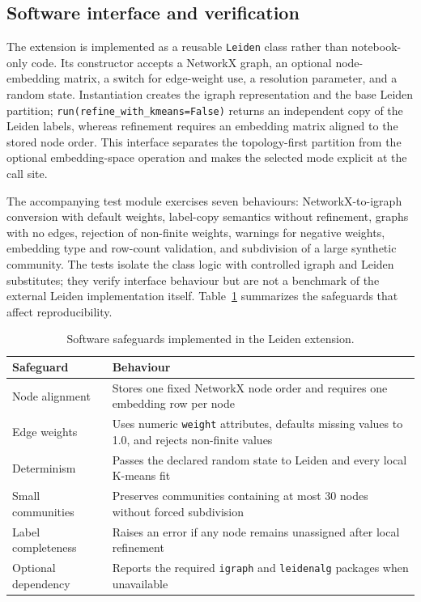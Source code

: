 \documentclass[11pt]{article}
\begin{document}
\subsection{Software interface and verification}

The extension is implemented as a reusable \texttt{Leiden} class rather than notebook-only code. Its constructor accepts a NetworkX graph, an optional node-embedding matrix, a switch for edge-weight use, a resolution parameter, and a random state. Instantiation creates the igraph representation and the base Leiden partition; \texttt{run(refine\_with\_kmeans=False)} returns an independent copy of the Leiden labels, whereas refinement requires an embedding matrix aligned to the stored node order. This interface separates the topology-first partition from the optional embedding-space operation and makes the selected mode explicit at the call site.

The accompanying test module exercises seven behaviours: NetworkX-to-igraph conversion with default weights, label-copy semantics without refinement, graphs with no edges, rejection of non-finite weights, warnings for negative weights, embedding type and row-count validation, and subdivision of a large synthetic community. The tests isolate the class logic with controlled igraph and Leiden substitutes; they verify interface behaviour but are not a benchmark of the external Leiden implementation itself. Table~\ref{tab:software} summarizes the safeguards that affect reproducibility.

\begin{table}[t]
\centering
\caption{Software safeguards implemented in the Leiden extension.}
\label{tab:software}
\small
\begin{tabular}{@{}>{\raggedright\arraybackslash}p{}>{\raggedright\arraybackslash}p{}@{}}
\toprule
Safeguard & Behaviour \\
\midrule
Node alignment & Stores one fixed NetworkX node order and requires one embedding row per node \\ \addlinespace[3pt]
Edge weights & Uses numeric \texttt{weight} attributes, defaults missing values to 1.0, and rejects non-finite values \\ \addlinespace[3pt]
Determinism & Passes the declared random state to Leiden and every local K-means fit \\ \addlinespace[3pt]
Small communities & Preserves communities containing at most 30 nodes without forced subdivision \\ \addlinespace[3pt]
Label completeness & Raises an error if any node remains unassigned after local refinement \\ \addlinespace[3pt]
Optional dependency & Reports the required \texttt{igraph} and \texttt{leidenalg} packages when unavailable \\
\bottomrule
\end{tabular}
\end{table}
\end{document}
